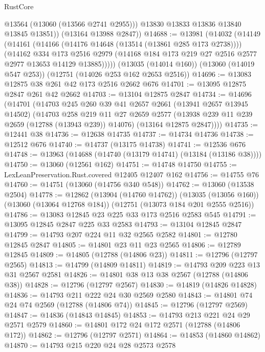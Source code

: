 \begin{lexlean}{RustCore}
\begin{coremodule}
            @13564
            (@13060 (@13566 @2741 @2955)))
          @13830
          @13833
          @13836
          @13840
          @13845
          @13851))
      (@13164 @13988 @2847))
@14688 := @13981
    (@14032
      (@14149
        (@14161
          (@14166 (@14176 @14648 (@13514 (@13861 @285 @173 @2738))))
          (@14162
            @334
            @173
            @2516
            @2979
            (@14168 @184 @173 @219 @27 @2516 @2577 @2977 @13653 @14129 @13885)))))
    (@13035 (@14014 @160))
    (@13060 (@14019 @547 @253))
    (@12751 (@14026 @253 @162 @2653 @2516))
@14696 := @13083 @12875 @38 @261 @42 @173 @2516 @2662 @676
@14701 := @13095 @12875 @2847 @261 @42 @2662
@14703 := @13104 @12875 @2847
@14734 := @14696
    (@14701
      (@14703
        @245
        @260
        @39
        @41
        @2657
        @2661
        (@13941 @2657 @13945 @14502)
        (@14703
          @258
          @219
          @11
          @27
          @2659
          @2577
          (@13938 @239 @11 @239 @2659 (@12788 (@13943 @239)) @14076)
          (@13164 @12875 @2847))))
@14735 := @12441 @38
@14736 := @12638 @14735
@14737 := @14734 @14736
@14738 := @12512 @676
@14740 := @14737 (@13175 @14738)
@14741 := @12536 @676
@14748 := @13963 (@14688 (@14740 (@13179 @14741) (@13184 (@13186 @38))))
@14750 := @13060 (@12561 @162)
@14751 := @14748 @14750
@14755 := LexLeanPreservation.Rust.covered @12405 @12407 @162
@14756 := @14755 @76
@14760 := @14751 (@13060 (@14756 @340 @548))
@14762 := @13060 (@13538 @2504)
@14778 := @12862
    (@13904 (@14760 @14762))
    (@13035 (@13056 @160))
    (@13060 (@13064 @12768 @184))
    (@12751 (@13073 @184 @201 @2555 @2516))
@14786 := @13083 @12845 @23 @225 @33 @173 @2516 @2583 @545
@14791 := @13095 @12845 @2847 @225 @33 @2583
@14793 := @13104 @12845 @2847
@14799 := @14793 @207 @224 @11 @32 @2565 @2582
@14801 := @12780 @12845 @2847
@14805 := @14801 @23 @11 @23 @2565
@14806 := @12789 @12845
@14809 := @14805 (@12788 (@14806 @23))
@14811 := @12796 (@12797 @2565)
@14813 := @14799 (@14809 @14811)
@14819 := @14793 @209 @223 @13 @31 @2567 @2581
@14826 := @14801 @38 @13 @38 @2567 (@12788 (@14806 @38))
@14828 := @12796 (@12797 @2567)
@14830 := @14819 (@14826 @14828)
@14836 := @14793 @211 @222 @24 @30 @2569 @2580
@14843 := @14801 @74 @24 @74 @2569 (@12788 (@14806 @74))
@14845 := @12796 (@12797 @2569)
@14847 := @14836 (@14843 @14845)
@14853 := @14793 @213 @221 @24 @29 @2571 @2579
@14860 := @14801 @172 @24 @172 @2571 (@12788 (@14806 @172))
@14862 := @12796 (@12797 @2571)
@14864 := @14853 (@14860 @14862)
@14870 := @14793 @215 @220 @24 @28 @2573 @2578

\end{coremodule}
\end{lexlean}
